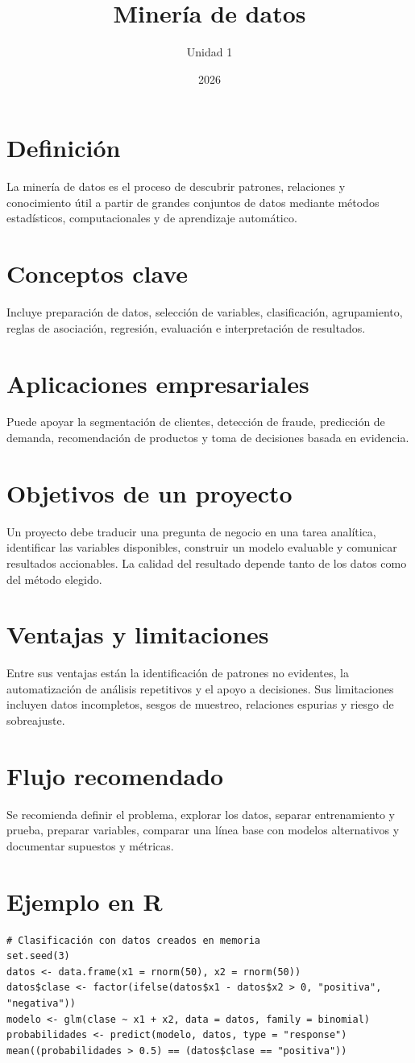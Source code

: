 \documentclass[12pt,a4paper]{article}
\title{Minería de datos}
\author{Unidad 1}
\date{2026}
\begin{document}
\maketitle
\section{Definición}
La minería de datos es el proceso de descubrir patrones, relaciones y conocimiento útil a partir de grandes conjuntos de datos mediante métodos estadísticos, computacionales y de aprendizaje automático.
\section{Conceptos clave}
Incluye preparación de datos, selección de variables, clasificación, agrupamiento, reglas de asociación, regresión, evaluación e interpretación de resultados.
\section{Aplicaciones empresariales}
Puede apoyar la segmentación de clientes, detección de fraude, predicción de demanda, recomendación de productos y toma de decisiones basada en evidencia.
\section{Objetivos de un proyecto}
Un proyecto debe traducir una pregunta de negocio en una tarea analítica, identificar las variables disponibles, construir un modelo evaluable y comunicar resultados accionables. La calidad del resultado depende tanto de los datos como del método elegido.
\section{Ventajas y limitaciones}
Entre sus ventajas están la identificación de patrones no evidentes, la automatización de análisis repetitivos y el apoyo a decisiones. Sus limitaciones incluyen datos incompletos, sesgos de muestreo, relaciones espurias y riesgo de sobreajuste.
\section{Flujo recomendado}
Se recomienda definir el problema, explorar los datos, separar entrenamiento y prueba, preparar variables, comparar una línea base con modelos alternativos y documentar supuestos y métricas.
\section{Ejemplo en R}
\begin{lstlisting}
# Clasificación con datos creados en memoria
set.seed(3)
datos <- data.frame(x1 = rnorm(50), x2 = rnorm(50))
datos$clase <- factor(ifelse(datos$x1 - datos$x2 > 0, "positiva", "negativa"))
modelo <- glm(clase ~ x1 + x2, data = datos, family = binomial)
probabilidades <- predict(modelo, datos, type = "response")
mean((probabilidades > 0.5) == (datos$clase == "positiva"))
\end{lstlisting}
\end{document}

